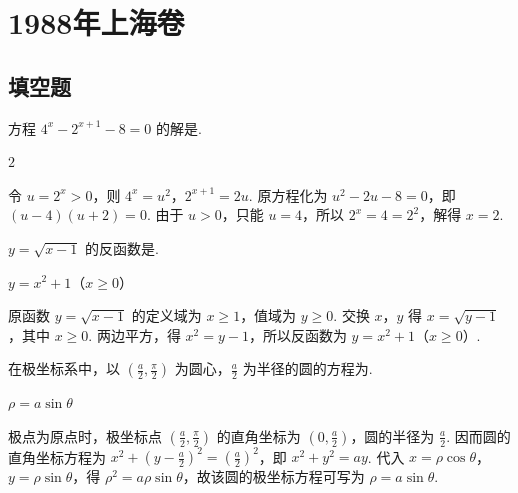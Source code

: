 \documentclass[UTF8,a4paper,oneside,11pt]{ctexbook}
\begin{document}
\mainmatter

\chapter{1988年上海卷}

\section{填空题}

\begin{problem}
方程 \(4^x-2^{x+1}-8=0\) 的解是\fillinblank{}.
\end{problem}

\begin{answer}
\(2\)
\end{answer}

\begin{solution}
令 \(u=2^x>0\)，则 \(4^x=u^2\)，\(2^{x+1}=2u\). 原方程化为 \(u^2-2u-8=0\)，即 \((u-4)(u+2)=0\). 由于 \(u>0\)，只能 \(u=4\)，所以 \(2^x=4=2^2\)，解得 \(x=2\).
\end{solution}

\begin{problem}
\(y=\sqrt{x-1}\) 的反函数是\fillinblank{}.
\end{problem}

\begin{answer}
\(y=x^2+1\)（\(x\geqslant0\)）
\end{answer}

\begin{solution}
原函数 \(y=\sqrt{x-1}\) 的定义域为 \(x\geqslant1\)，值域为 \(y\geqslant0\). 交换 \(x\)，\(y\) 得 \(x=\sqrt{y-1}\)，其中 \(x\geqslant0\). 两边平方，得 \(x^2=y-1\)，所以反函数为 \(y=x^2+1\)（\(x\geqslant0\)）.
\end{solution}

\begin{problem}
在极坐标系中，以 \(\left( \frac{a}{2},\frac{\pi}{2} \right)\) 为圆心，\(\frac{a}{2}\) 为半径的圆的方程为\fillinblank{}.
\end{problem}

\begin{answer}
\(\rho=a\sin\theta\)
\end{answer}

\begin{solution}
极点为原点时，极坐标点 \(\left(\frac a2,\frac\pi2\right)\) 的直角坐标为 \(\left(0,\frac a2\right)\)，圆的半径为 \(\frac a2\). 因而圆的直角坐标方程为 \(x^2+\left(y-\frac a2\right)^2=\left(\frac a2\right)^2\)，即 \(x^2+y^2=ay\). 代入 \(x=\rho\cos\theta\)，\(y=\rho\sin\theta\)，得 \(\rho^2=a\rho\sin\theta\)，故该圆的极坐标方程可写为 \(\rho=a\sin\theta\).
\end{solution}
\end{document}
